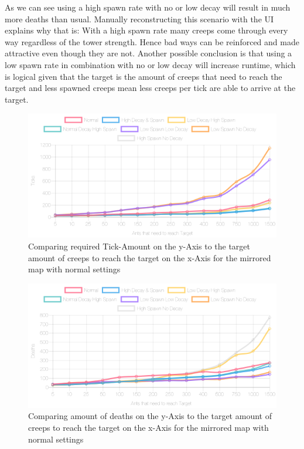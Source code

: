 As we can see using a high spawn rate with no or low decay will result in much more deaths than usual. Manually reconstructing this scenario with the UI explains why that is: With a high spawn rate many creeps come through every way regardless of the tower strength. Hence bad ways can be reinforced and made attractive even though they are not.
Another possible conclusion is that using a low spawn rate in combination with no or low decay will increase runtime, which is logical given that the target is the amount of creeps that need to reach the target and less spawned creeps mean less creeps per tick are able to arrive at the target. 

\begin{figure}[H]
  \centering
  \includegraphics[width=1\linewidth]{images/mirroredwithtower-ticks-line}
  \caption{Comparing required Tick-Amount on the y-Axis to the target amount of creeps to reach the target on the x-Axis for the mirrored map with normal settings}
  \label{fig:diffsettings}
\end{figure}

\begin{figure}[H]
  \centering
  \includegraphics[width=1\linewidth]{images/mirroredwithtower-deaths-line}
  \caption{Comparing amount of deaths on the y-Axis to the target amount of creeps to reach the target on the x-Axis for the mirrored map with normal settings}
  \label{fig:diffsettingsdeath}
\end{figure}

